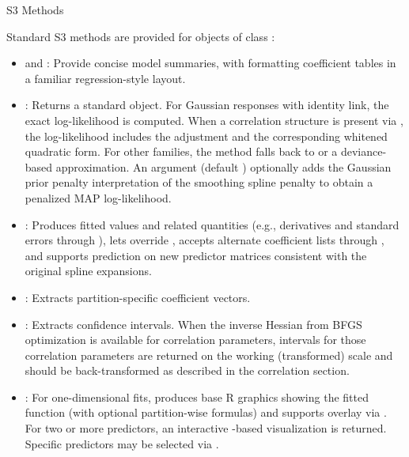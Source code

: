\begin{Section}{S3 Methods}


Standard S3 methods are provided for objects of class :
\begin{itemize}

\item{}  and :
Provide concise model summaries, with
 formatting coefficient tables in a
familiar regression-style layout.

\item{} : Returns a standard 
object. For Gaussian responses with identity link, the exact
log-likelihood is computed. When a correlation structure is present via
, the log-likelihood includes the
 adjustment and the corresponding
whitened quadratic form. For other families, the method falls back to
 or a deviance-based approximation. An
 argument (default ) optionally adds
the Gaussian prior penalty interpretation of the smoothing spline
penalty
to obtain a penalized MAP log-likelihood.

\item{} : Produces fitted values and related
quantities (e.g., derivatives and standard errors through
), lets  override
, accepts alternate coefficient lists through
, and supports prediction on new predictor matrices
consistent with the original spline expansions.

\item{} : Extracts partition-specific
coefficient vectors.

\item{} : Extracts confidence intervals.
When the inverse Hessian from BFGS optimization is available for
correlation parameters, intervals for those correlation parameters are
returned on the working (transformed) scale and should be
back-transformed as described in the correlation section.
\item{} : For one-dimensional fits, produces
base R graphics showing the fitted function (with optional partition-wise
formulas) and supports overlay via . For two or more
predictors, an interactive -based visualization is
returned. Specific predictors may be selected via .


\end{itemize}
\end{Section}
